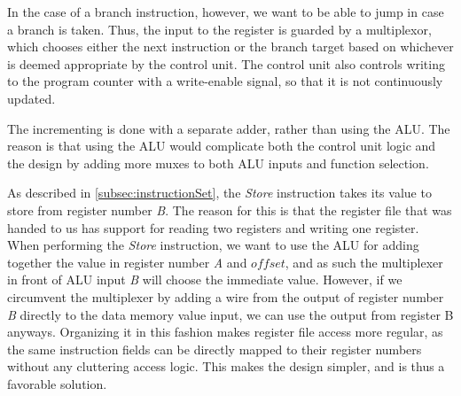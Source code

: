 \documentclass[11pt]{article}
\begin{document}
In the case of a branch instruction, however, we want to be able to
jump in case a branch is taken.  Thus, the input to the register is
guarded by a multiplexor, which chooses either the next instruction or
the branch target based on whichever is deemed appropriate by the
control unit. The control unit also controls writing to the program
counter with a write-enable signal, so that it is not continuously
updated.

The incrementing is done with a separate adder, rather than using the
ALU. The reason is that using the ALU would complicate both the
control unit logic and the design by adding more muxes to both ALU
inputs and function selection.

As described in \autoref{subsec:instructionSet}, the {\em Store}
instruction takes its value to store from register number {\em B}. The
reason for this is that the register file that was handed to us has
support for reading two registers and writing one register. When
performing the {\em Store} instruction, we want to use the ALU for
adding together the value in register number {\em A} and $offset$, and
as such the multiplexer in front of ALU input {\em B} will choose the
immediate value. However, if we circumvent the multiplexer by adding a
wire from the output of register number {\em B} directly to the data
memory value input, we can use the output from register B
anyways. Organizing it in this fashion makes register file access more
regular, as the same instruction fields can be directly mapped to
their register numbers without any cluttering access logic. This makes
the design simpler, and is thus a favorable solution.
\end{document}
